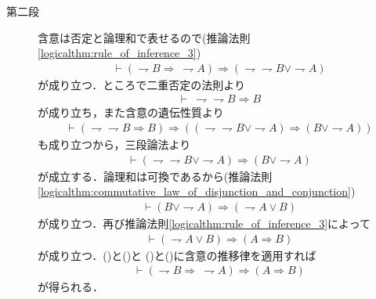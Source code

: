 \begin{prf}
\begin{description}
			\item[第二段]
				含意は否定と論理和で表せるので(推論法則\ref{logicalthm:rule_of_inference_3})
				\begin{align}
					\vdash (\rightharpoondown B \Longrightarrow\ \rightharpoondown A)
					\Longrightarrow (\rightharpoondown \rightharpoondown B \vee \rightharpoondown A)
					\label{eq:thm_contraposition_is_true_5}
				\end{align}
				が成り立つ．ところで二重否定の法則より
				\begin{align}
					\vdash\ \rightharpoondown \rightharpoondown B \Longrightarrow B
				\end{align}
				が成り立ち，また含意の遺伝性質より
				\begin{align}
					\vdash (\rightharpoondown \rightharpoondown B \Longrightarrow B)
					\Longrightarrow ((\rightharpoondown \rightharpoondown B \vee \rightharpoondown A)
					\Longrightarrow (B \vee \rightharpoondown A))
				\end{align}
				も成り立つから，三段論法より
				\begin{align}
					\vdash (\rightharpoondown \rightharpoondown B \vee \rightharpoondown A)
					\Longrightarrow (B \vee \rightharpoondown A)
					\label{eq:thm_contraposition_is_true_6}
				\end{align}
				が成立する．論理和は可換であるから(推論法則\ref{logicalthm:commutative_law_of_disjunction_and_conjunction})
				\begin{align}
					\vdash (B \vee \rightharpoondown A) \Longrightarrow (\rightharpoondown A \vee B)
					\label{eq:thm_contraposition_is_true_7}
				\end{align}
				が成り立つ．再び推論法則\ref{logicalthm:rule_of_inference_3}によって
				\begin{align}
					\vdash (\rightharpoondown A \vee B)
					\Longrightarrow (A \Longrightarrow B)
					\label{eq:thm_contraposition_is_true_8}
				\end{align}
				が成り立つ．()と()と
				()と()に含意の推移律を適用すれば
				\begin{align}
					\vdash (\rightharpoondown B \Longrightarrow\ \rightharpoondown A) \Longrightarrow (A \Longrightarrow B)
				\end{align}
				が得られる．
				\QED
		\end{description}
	\end{prf}
	
